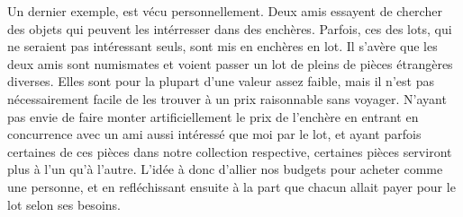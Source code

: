 \documentclass[12pt,twoside,a4paper]{article}
\begin{document}
Un dernier exemple, est v\'ecu personnellement. Deux amis essayent de chercher des objets qui peuvent les int\'erresser dans des ench\`eres. Parfois, ces des lots, qui ne seraient pas int\'eressant seuls, sont mis en ench\`eres en lot. Il s'av\`ere que les deux amis sont numismates et voient passer un lot de pleins de pi\`eces \'etrang\`eres diverses. Elles sont pour la plupart d'une valeur assez faible, mais il n'est pas n\'ecessairement facile de les trouver \`a un prix raisonnable sans voyager. N'ayant pas envie de faire monter artificiellement le prix de l'ench\`ere en entrant en concurrence avec un ami aussi int\'eress\'e que moi par le lot, et ayant parfois certaines de ces pi\`eces dans notre collection respective, certaines pi\`eces serviront plus \`a l'un qu'\`a l'autre. L'id\'ee \`a donc d'allier nos budgets pour acheter comme une personne, et en refl\'echissant ensuite \`a la part que chacun allait payer pour le lot selon ses besoins.
\end{document}
